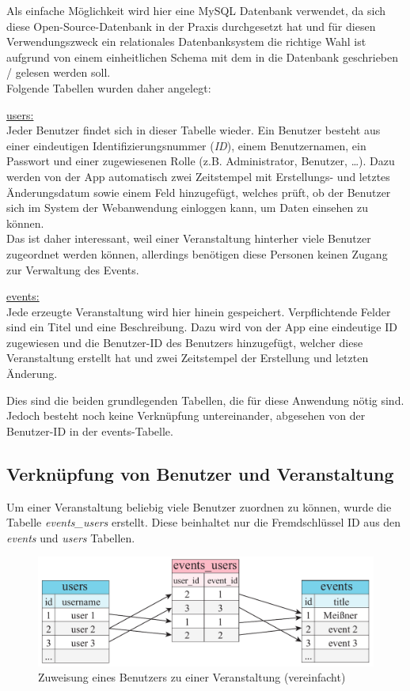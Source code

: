 Als einfache Möglichkeit wird hier eine MySQL Datenbank verwendet, da sich diese Open-Source-Datenbank in der Praxis durchgesetzt hat und für diesen Verwendungszweck ein relationales Datenbanksystem die richtige Wahl ist aufgrund von einem einheitlichen Schema mit dem in die Datenbank geschrieben / gelesen werden soll.\\
Folgende Tabellen wurden daher angelegt:\par

\underline{users:}\\
Jeder Benutzer findet sich in dieser Tabelle wieder. Ein Benutzer besteht aus einer eindeutigen Identifizierungsnummer (\emph{ID}), einem Benutzernamen, ein Passwort und einer zugewiesenen Rolle (z.B. Administrator, Benutzer, \dots). Dazu werden von der App automatisch zwei Zeitstempel mit Erstellungs- und letztes Änderungsdatum sowie einem Feld hinzugefügt, welches prüft, ob der Benutzer sich im System der Webanwendung einloggen kann, um Daten einsehen zu können.\\
Das ist daher interessant, weil einer Veranstaltung hinterher viele Benutzer zugeordnet werden können, allerdings benötigen diese Personen keinen Zugang zur Verwaltung des Events.

\underline{events:}\\
Jede erzeugte Veranstaltung wird hier hinein gespeichert. Verpflichtende Felder sind ein Titel und eine Beschreibung. Dazu wird von der App eine eindeutige ID zugewiesen und die Benutzer-ID des Benutzers hinzugefügt, welcher diese Veranstaltung erstellt hat und zwei Zeitstempel der Erstellung und letzten Änderung.\par

Dies sind die beiden grundlegenden Tabellen, die für diese Anwendung nötig sind. Jedoch besteht noch keine Verknüpfung untereinander, abgesehen von der Benutzer-ID in der events-Tabelle.

\subsection{Verknüpfung von Benutzer und Veranstaltung}
Um einer Veranstaltung beliebig viele Benutzer zuordnen zu können, wurde die Tabelle \emph{events\_users} erstellt. Diese beinhaltet nur die Fremdschlüssel ID aus den \emph{events} und \emph{users} Tabellen.

\begin{figure}[!ht]
	\centering
	\includegraphics[width=15cm]{fig/events_users}
	\caption{Zuweisung eines Benutzers zu einer Veranstaltung (vereinfacht)}
\end{figure}

